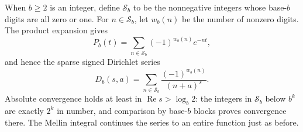 \documentclass[11pt,a4paper,oneside,openany]{book}
\numberwithin{equation}{chapter}
\theoremstyle{definition}
\theoremstyle{remark}
\DeclareMathOperator{\Rea}{Re}
\begin{document}
When $b\ge2$ is an integer, define $\mathcal S_b$ to be the
nonnegative integers whose base-$b$ digits are all zero or one.
For $n\in\mathcal S_b$, let $w_b(n)$ be the number of nonzero
digits. The product expansion gives
\begin{equation}
 P_b(t)=\sum_{n\in\mathcal S_b}(-1)^{w_b(n)}e^{-nt},
 \label{dc:eq:base-digit-series}
\end{equation}
and hence the sparse signed Dirichlet series
\begin{equation}
 D_b(s,a)=\sum_{n\in\mathcal S_b}
       \frac{(-1)^{w_b(n)}}{(n+a)^s}.
 \label{dc:eq:base-Dirichlet}
\end{equation}
Absolute convergence holds at least in $\Rea s>\log_b2$:
the integers in $\mathcal S_b$ below $b^k$ are exactly $2^k$ in
number, and comparison by base-$b$ blocks proves convergence there.
The Mellin integral continues the series to an entire function just
as before.
\end{document}
